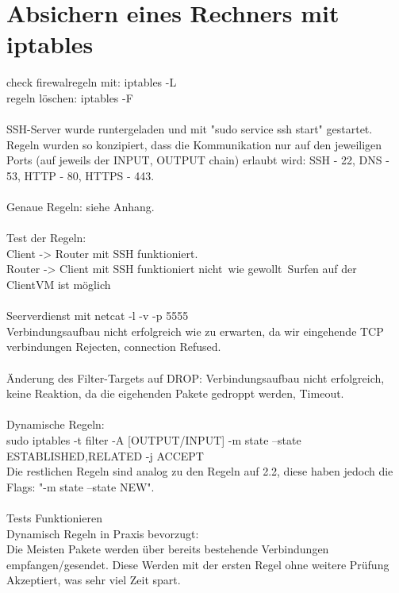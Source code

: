 \documentclass[12pt]{article}
\theoremstyle{plain}
\begin{document}
\section{Absichern eines Rechners mit iptables}
check firewalregeln mit: iptables -L\\
regeln löschen: iptables -F\\\\
SSH-Server wurde runtergeladen und mit "sudo service ssh start" gestartet.\\
Regeln wurden so konzipiert, dass die Kommunikation nur auf den jeweiligen Ports (auf jeweils der INPUT, OUTPUT chain) erlaubt wird: SSH - 22, DNS - 53, HTTP - 80, HTTPS - 443.\\\\
Genaue Regeln: siehe Anhang.\\\\
Test der Regeln: \\
Client -> Router mit SSH funktioniert.\\
Router -> Client mit SSH funktioniert nicht\, wie gewollt\
Surfen auf der ClientVM ist möglich\\
\\
Seerverdienst mit netcat -l -v -p 5555\\
Verbindungsaufbau nicht erfolgreich wie zu erwarten, da wir eingehende TCP verbindungen Rejecten, connection Refused.\\\\
Änderung des Filter-Targets auf DROP:
Verbindungsaufbau nicht erfolgreich, keine Reaktion, da die eigehenden Pakete gedroppt werden, Timeout.\\
\\
Dynamische Regeln:\\
sudo iptables -t filter -A [OUTPUT/INPUT] -m state --state ESTABLISHED,RELATED -j ACCEPT\\
Die restlichen Regeln sind analog zu den Regeln auf 2.2, diese haben jedoch die Flags: "-m state --state NEW".\\\\
Tests Funktionieren\\
Dynamisch  Regeln in Praxis bevorzugt:\\
Die Meisten Pakete werden über bereits bestehende Verbindungen empfangen/gesendet. Diese Werden mit der ersten Regel ohne weitere Prüfung Akzeptiert, was sehr viel Zeit spart.
\end{document}
